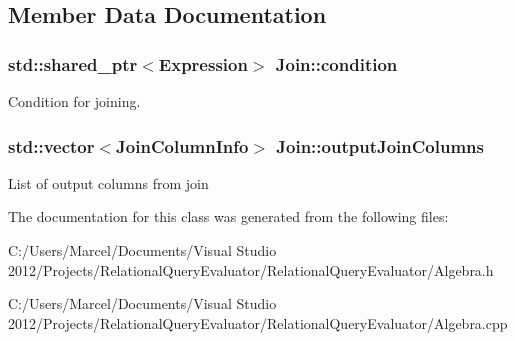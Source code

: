 \subsection{Member Data Documentation}
\hypertarget{class_join_aa1374c434547d1a0a478a914ac0445bb}{
\subsubsection[{condition}]{\setlength{\rightskip}{0pt plus 5cm}std\+::shared\+\_\+ptr$<${\bf Expression}$>$ Join\+::condition}}\label{class_join_aa1374c434547d1a0a478a914ac0445bb}
Condition for joining. \hypertarget{class_join_ad0fbf6166d055f84e2a1e9ec5af9824a}{
\subsubsection[{output\+Join\+Columns}]{\setlength{\rightskip}{0pt plus 5cm}std\+::vector$<${\bf Join\+Column\+Info}$>$ Join\+::output\+Join\+Columns}}\label{class_join_ad0fbf6166d055f84e2a1e9ec5af9824a}
List of output columns from join 

The documentation for this class was generated from the following files\+:\begin{DoxyCompactItemize}
\item 
C\+:/\+Users/\+Marcel/\+Documents/\+Visual Studio 2012/\+Projects/\+Relational\+Query\+Evaluator/\+Relational\+Query\+Evaluator/Algebra.\+h\item 
C\+:/\+Users/\+Marcel/\+Documents/\+Visual Studio 2012/\+Projects/\+Relational\+Query\+Evaluator/\+Relational\+Query\+Evaluator/Algebra.\+cpp\end{DoxyCompactItemize}
